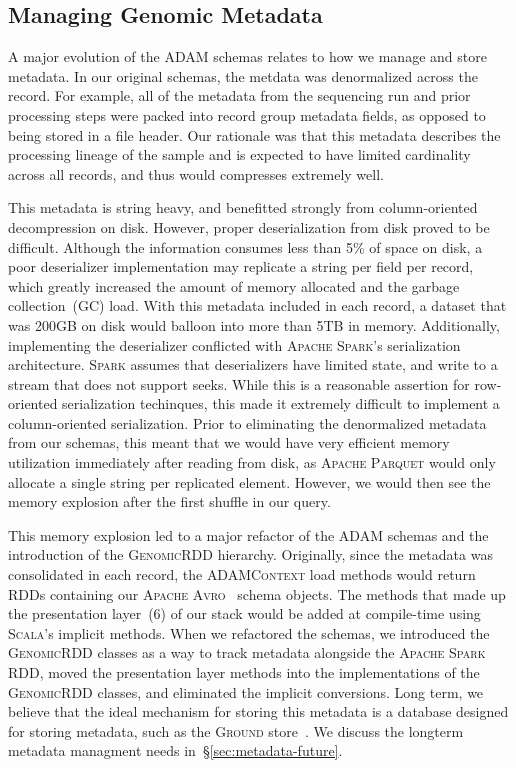 \documentclass[phd]{ucbthesis}
\begin{document}
\subsection{Managing Genomic Metadata}
\label{sec:metadata}

A major evolution of the \textsc{ADAM} schemas relates to how we manage and
store metadata. In our original schemas, the metdata was denormalized across the
record. For example, all of the metadata from the sequencing run and prior
processing steps were packed into record group metadata fields, as opposed to
being stored in a file header. Our rationale was that this metadata describes
the processing lineage of the sample and is expected to have limited cardinality
across all records, and thus would compresses extremely well.

This metadata is string heavy, and benefitted strongly from column-oriented
decompression on disk. However, proper deserialization from disk proved to be
difficult. Although the information consumes less than 5\% of space on disk, a
poor deserializer implementation may replicate a string per field per record,
which greatly increased the amount of memory allocated and the garbage
collection~(GC) load. With this metadata included in each record, a dataset
that was 200GB on disk would balloon into more than 5TB in memory. Additionally,
implementing the deserializer conflicted with \textsc{Apache Spark}'s
serialization architecture. \textsc{Spark} assumes that deserializers have
limited state, and write to a stream that does not support seeks. While this is
a reasonable assertion for row-oriented serialization techinques, this made it
extremely difficult to implement a column-oriented serialization. Prior to
eliminating the denormalized metadata from our schemas, this meant that we would
have very efficient memory utilization immediately after reading from disk, as
\textsc{Apache Parquet} would only allocate a single string per replicated
element. However, we would then see the memory explosion after the first shuffle
in our query.

This memory explosion led to a major refactor of the \textsc{ADAM} schemas and
the introduction of the \textsc{GenomicRDD} hierarchy. Originally, since the
metadata was consolidated in each record, the \textsc{ADAMContext} load methods
would return \textsc{RDD}s containing our \textsc{Apache Avro}~\cite{avro}
schema objects. The methods that made up the presentation layer~(6) of our stack
would be added at compile-time using \textsc{Scala}'s implicit methods. When we
refactored the schemas, we introduced the \textsc{GenomicRDD} classes as a way
to track metadata alongside the \textsc{Apache Spark} RDD, moved the
presentation layer methods into the implementations of the \textsc{GenomicRDD}
classes, and eliminated the implicit conversions. Long term, we believe that the
ideal mechanism for storing this metadata is a database designed for storing
metadata, such as the \textsc{Ground} store~\cite{hellerstein17}. We discuss the
longterm metadata managment needs in~\S\ref{sec:metadata-future}.
\end{document}
